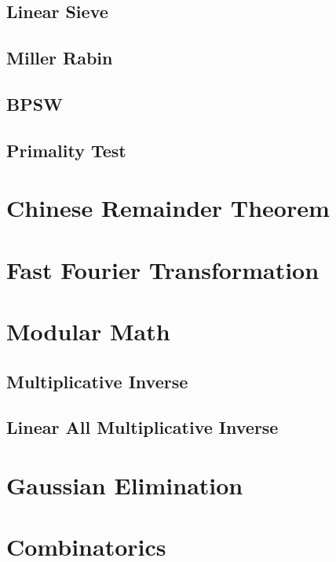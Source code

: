 \documentclass[10pt,a4paper]{report}
\begin{document}
		\subsection{Linear Sieve}
			
		\subsection{Miller Rabin}
			
		\subsection{BPSW}
			
		\subsection{Primality Test}
			
		
	\section{Chinese Remainder Theorem}
	
	\newpage
	\section{Fast Fourier Transformation}
		
	
	\section{Modular Math}
		\subsection{Multiplicative Inverse}
		\subsection{Linear All Multiplicative Inverse}
	
	\section{Gaussian Elimination}
	
	\section{Combinatorics}
	
\end{document}
